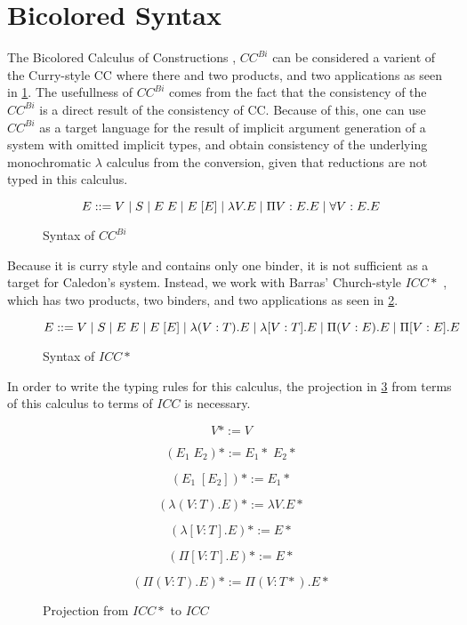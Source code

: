 \section{Bicolored Syntax}

The Bicolored Calculus of Constructions \citep{luther2001more}, $CC^{Bi}$
can be considered a varient of the Curry-style CC where there and two products, and two applications as seen in \ref{ccbi:syntax}.
The usefullness of $CC^{Bi}$ comes from the fact that the
consistency of the $CC^{Bi}$ is a direct result of the consistency of CC.
Because of this, one can use $CC^{Bi}$ as a target language for the result of implicit argument 
generation of a system with omitted implicit types, and obtain consistency of 
the underlying monochromatic $\lambda$ calculus from the conversion,
given that reductions are not typed in this calculus.

\begin{figure}[H]
\[ 
E ::= V 
 \; | \; S 
 \; | \; E\;E 
 \; | \; E\;[E]
 \; | \; \lambda V . E 
 \; | \; \Pi V : E . E 
 \; | \; \forall V : E . E 
\]
\caption{Syntax of $CC^{Bi}$}
\label{ccbi:syntax}
\end{figure}

Because it is curry style and contains only one binder, it is not sufficient 
as a target for Caledon's system.  Instead, we work with Barras' Church-style $ICC*$ \citep{barras2008implicit}, 
which has two products, two binders, and two applications as seen in \ref{icc*:syntax}.

\begin{figure}[H]
\[ 
E ::= V 
 \; | \; S 
 \; | \; E\;E 
 \; | \; E\;[E]
 \; | \; \lambda (V : T). E 
 \; | \; \lambda [V : T] . E 
 \; | \; \Pi (V : E) . E 
 \; | \; \Pi [V : E] . E 
\]
\caption{Syntax of $ICC*$}
\label{icc*:syntax}
\end{figure}

In order to write the typing rules for this calculus, 
the projection in \ref{icc*:proj} from terms of this calculus 
to terms of $ICC$ is necessary.  

\begin{figure}[H]
\[ 
V* := V
\]

\[
(E_1\;E_2)* := E_1* \; E_2*
\]

\[
(E_1\;[E_2])* := E_1*
\]

\[
(\lambda (V : T). E )* := \lambda V. E*
\]

\[
(\lambda [V : T]. E )* := E*
\]

\[
(\Pi [V : T]. E )* := E*
\]

\[
(\Pi (V : T). E )* := \Pi (V : T*). E*
\]
\caption{Projection from $ICC*$ to $ICC$}
\label{icc*:proj}
\end{figure}

